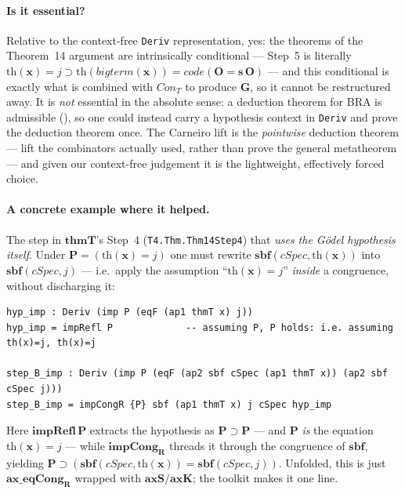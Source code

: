 \documentclass[11pt]{article}
\theoremstyle{plain}
\theoremstyle{definition}
\theoremstyle{remark}
\newcommand{\code}[1]{\mathit{code}(#1)}
\newcommand{\sbf}{\mathbf{sbf}}
\newcommand{\thmT}{\mathbf{thmT}}
\newcommand{\Con}{\mathit{Con}}
\begin{document}
\paragraph{Is it essential?}  Relative to the context-free
\verb|Deriv| representation, yes: the theorems of the Theorem~14
argument are intrinsically conditional --- Step~5 is literally
$\mathrm{th}(\mathbf{x}) = j \supset \mathrm{th}(\mathit{bigterm}(\mathbf{x}))
= \code{\mathbf{O}=\mathbf{s}\,\mathbf{O}}$ --- and this conditional is
exactly what is combined with $\Con_T$ to produce $\mathbf{G}$, so it
cannot be restructured away.  It is \emph{not} essential in the absolute
sense: a deduction theorem for BRA is admissible (\cite[Exercise~19]{Guard63}),
so one could instead carry a hypothesis context in \verb|Deriv| and prove
the deduction theorem once.  The Carneiro lift is the \emph{pointwise}
deduction theorem --- lift the combinators actually used, rather than
prove the general metatheorem --- and given our context-free judgement it
is the lightweight, effectively forced choice.

\paragraph{A concrete example where it helped.}  The step in
$\thmT$'s Step~4 (\verb|T4.Thm.Thm14Step4|) that \emph{uses the
G\"odel hypothesis itself}.  Under $\mathbf{P} = (\mathrm{th}(\mathbf{x})
= j)$ one must rewrite $\sbf(\mathit{cSpec}, \mathrm{th}(\mathbf{x}))$
into $\sbf(\mathit{cSpec}, j)$ --- i.e.\ apply the assumption
``$\mathrm{th}(\mathbf{x}) = j$'' \emph{inside} a congruence, without
discharging it:
\begin{lstlisting}
hyp_imp : Deriv (imp P (eqF (ap1 thmT x) j))
hyp_imp = impRefl P             -- assuming P, P holds: i.e. assuming th(x)=j, th(x)=j

step_B_imp : Deriv (imp P (eqF (ap2 sbf cSpec (ap1 thmT x)) (ap2 sbf cSpec j)))
step_B_imp = impCongR {P} sbf (ap1 thmT x) j cSpec hyp_imp
\end{lstlisting}
Here $\mathbf{impRefl}\,\mathbf{P}$ extracts the hypothesis as
$\mathbf{P} \supset \mathbf{P}$ --- and $\mathbf{P}$ \emph{is} the
equation $\mathrm{th}(\mathbf{x}) = j$ --- while $\mathbf{impCong_R}$
threads it through the congruence of $\sbf$, yielding
$\mathbf{P} \supset (\sbf(\mathit{cSpec}, \mathrm{th}(\mathbf{x})) =
\sbf(\mathit{cSpec}, j))$.  Unfolded, this is just $\mathbf{ax\_eqCong_R}$
wrapped with $\mathbf{axS}/\mathbf{axK}$; the toolkit makes it one line.
\end{document}
